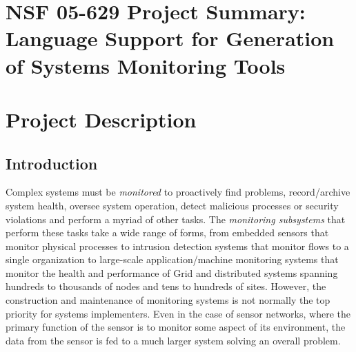 \documentclass[11pt]{article}
\begin{document}
\setcounter{page}{1}
\appendix
\section{NSF 05-629 Project Summary:  \\
Language Support for Generation of Systems Monitoring Tools}

\newpage
\setcounter{page}{1}
\section{Project Description}

\subsection{Introduction}
\label{ssec:intro}

Complex systems must be {\em monitored} to proactively find problems,
record/archive system health, oversee system operation, detect
malicious processes or security violations and perform a myriad of other tasks.
The {\em monitoring subsystems} 
that perform these tasks take a wide range of forms, 
from embedded sensors that monitor physical processes to
intrusion detection systems that monitor flows to a single
organization to large-scale application/machine monitoring systems
that monitor the health and performance of Grid and distributed
systems spanning hundreds to thousands of nodes and tens to hundreds
of sites.  However, the construction and maintenance of monitoring systems
is not normally the top priority for systems implementers.  Even in the 
case of sensor
networks, where the primary function of the sensor is to monitor some
aspect of its environment, the data from the sensor is fed to a much
larger system solving an overall problem.
\end{document}
